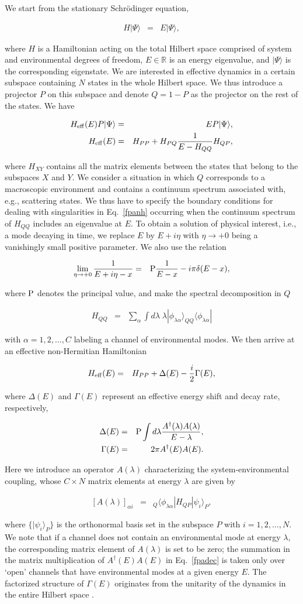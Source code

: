 \documentclass{tADP2e}
\theoremstyle{plain}
\newcommand{\eqn}[1]{
\begin{eqnarray}
	#1
\end{eqnarray}
}
\theoremstyle{plain}
\theoremstyle{definition}
\begin{document}
We start from the stationary Schr{\"o}dinger equation,
\eqn{
H|\Psi\rangle & = & E|\Psi\rangle,
}
where $H$ is a Hamiltonian acting on the total Hilbert space comprised of system and environmental degrees of freedom,  $E\in\mathbb{R}$ is an energy eigenvalue, and $|\Psi\rangle$ is the corresponding eigenstate. We are interested in effective dynamics in a certain subspace containing $N$ states in the whole Hilbert space. We thus introduce a projector $P$ on this subspace and denote $Q=1-P$ as the projector on the rest of the states.  We have
\eqn{\label{fpanh1}
H_{{\rm eff}}(E)P|\Psi\rangle & = & EP|\Psi\rangle,\\
H_{{\rm eff}}(E) & = & H_{PP}+H_{PQ}\frac{1}{E-H_{QQ}}H_{QP},\label{fpanh}
}
where $H_{XY}$ contains all the matrix elements between the states that belong to the subspaces  $X$ and $Y$. We consider a situation in which $Q$ corresponds to a macroscopic environment and contains a continuum spectrum associated with, e.g., scattering states. We thus have to specify the boundary conditions for dealing with singularities in Eq.~\eqref{fpanh} occurring when the continuum spectrum of $H_{QQ}$ includes an eigenvalue at $E$.  To obtain a solution of physical interest, i.e., a mode decaying in time, we replace $E$ by $E+i\eta$ with $\eta\to+0$ being a vanishingly small positive parameter. We also use the relation
\eqn{
\lim_{\eta\to+0}\frac{1}{E+i\eta-x} & = & {\rm P}\frac{1}{E-x}-i\pi\delta(E-x),
}
where ${\rm P}$ denotes the principal value, and make the spectral decomposition in $Q$
\eqn{
H_{QQ} & = & \sum_{\alpha}\int d\lambda\;\lambda|\phi_{\lambda\alpha}\rangle_{QQ}\langle\phi_{\lambda\alpha}|
}
with $\alpha=1,2,\ldots,C$ labeling a channel of environmental modes. We then arrive at an effective non-Hermitian Hamiltonian
\eqn{\label{fpanonher}
H_{{\rm eff}}(E) & = & H_{PP}+\Delta(E)-\frac{i}{2}\Gamma(E),
}
where $\Delta(E)$ and $\Gamma(E)$ represent an effective energy shift and decay rate, respectively,
\eqn{
\Delta(E) & = & {\rm P}\int d\lambda\frac{A^\dagger(\lambda)A(\lambda)}{E-\lambda},\\
\Gamma(E) & = & 2\pi A^\dagger(E)A(E).\label{fpadec}
}
Here we introduce an operator $A(\lambda)$ characterizing the system-environmental coupling, whose  $C\times N$ matrix elements at energy $\lambda$ are given by
\eqn{
[A(\lambda)]_{\alpha i} & = & _{Q}\langle\phi_{\lambda\alpha}|H_{QP}|\psi_{i}\rangle_P,
}
where $\{|\psi_i\rangle_P\}$ is the orthonormal basis set in the subspace $P$ with $i=1,2,\ldots,N$.  
We note that if a channel does not contain an environmental mode at energy $\lambda$, the corresponding matrix element of $A(\lambda)$ is set to be zero;  the summation in the matrix multiplication of $A^\dagger(E)A(E)$ in Eq.~\eqref{fpadec} is taken only over `open' channels that have environmental modes at a given energy $E$. The factorized structure of $\Gamma(E)$ originates from the unitarity of the dynamics in the entire Hilbert space \cite{DL76}.
\end{document}
